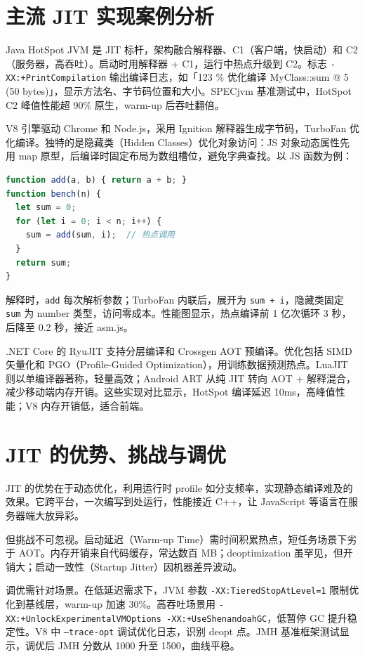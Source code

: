 \chapter{主流 JIT 实现案例分析}
Java HotSpot JVM 是 JIT 标杆，架构融合解释器、C1（客户端，快启动）和 C2（服务器，高吞吐）。启动时用解释器 + C1，运行中热点升级到 C2。标志 \texttt{-XX:+PrintCompilation} 输出编译日志，如「123 \%{} 优化编译 MyClass::sum @ 5 (50 bytes)」，显示方法名、字节码位置和大小。SPECjvm 基准测试中，HotSpot C2 峰值性能超 90\%{} 原生，warm-up 后吞吐翻倍。\par
V8 引擎驱动 Chrome 和 Node.js，采用 Ignition 解释器生成字节码，TurboFan 优化编译。独特的是隐藏类（Hidden Classes）优化对象访问：JS 对象动态属性先用 map 原型，后编译时固定布局为数组槽位，避免字典查找。以 JS 函数为例：\par
\begin{lstlisting}[language=javascript]
function add(a, b) { return a + b; }
function bench(n) {
  let sum = 0;
  for (let i = 0; i < n; i++) {
    sum = add(sum, i);  // 热点调用
  }
  return sum;
}
\end{lstlisting}
解释时，\texttt{add} 每次解析参数；TurboFan 内联后，展开为 \texttt{sum + i}，隐藏类固定 \texttt{sum} 为 number 类型，访问零成本。性能图显示，热点编译前 1 亿次循环 3 秒，后降至 0.2 秒，接近 asm.js。\par
.NET Core 的 RyuJIT 支持分层编译和 Crossgen AOT 预编译。优化包括 SIMD 矢量化和 PGO（Profile-Guided Optimization），用训练数据预测热点。LuaJIT 则以单编译器著称，轻量高效；Android ART 从纯 JIT 转向 AOT + 解释混合，减少移动端内存开销。这些实现对比显示，HotSpot 编译延迟 10ms，高峰值性能；V8 内存开销低，适合前端。\par
\chapter{JIT 的优势、挑战与调优}
JIT 的优势在于动态优化，利用运行时 profile 如分支频率，实现静态编译难及的效果。它跨平台，一次编写到处运行，性能接近 C++，让 JavaScript 等语言在服务器端大放异彩。\par
但挑战不可忽视。启动延迟（Warm-up Time）需时间积累热点，短任务场景下劣于 AOT。内存开销来自代码缓存，常达数百 MB；deoptimization 虽罕见，但开销大；启动一致性（Startup Jitter）因机器差异波动。\par
调优需针对场景。在低延迟需求下，JVM 参数 \texttt{-XX:TieredStopAtLevel=1} 限制优化到基线层，warm-up 加速 30\%{}。高吞吐场景用 \texttt{-XX:+UnlockExperimentalVMOptions -XX:+UseShenandoahGC}，低暂停 GC 提升稳定性。V8 中 \texttt{--trace-opt} 调试优化日志，识别 deopt 点。JMH 基准框架测试显示，调优后 JMH 分数从 1000 升至 1500，曲线平稳。\par
